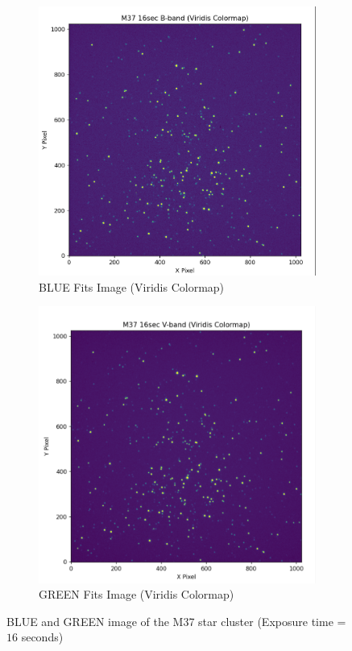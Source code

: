 \documentclass[12pt,a4paper]{article}
\begin{document}
\begin{figure}[H]
  \centering
  \begin{subfigure}{0.49\textwidth}
    \centering
    \includegraphics[width=1.0\textwidth]{Pictures/B_Band_Viridis.png}
    \caption{BLUE Fits Image (Viridis Colormap)}
    \label{fig:B_fits}  
  \end{subfigure}
  \begin{subfigure}{0.49\textwidth}
    \centering
    \includegraphics[width=1.0\textwidth]{Pictures/V_Band_Viridis.png} 
    \caption{GREEN Fits Image (Viridis Colormap)}
    \label{fig:V_fits}
  \end{subfigure}
  \caption{BLUE and GREEN image of the M37 star cluster (Exposure time = $16$ seconds)}
\end{figure}
\end{document}
